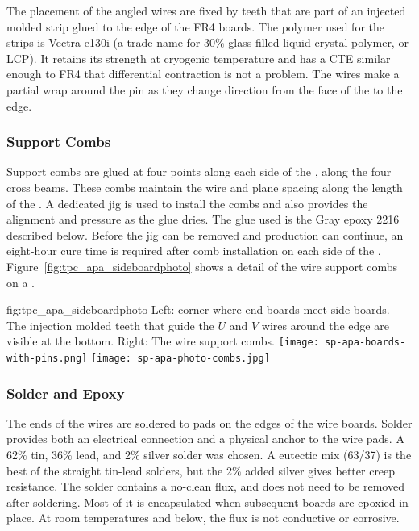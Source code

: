 The placement of the angled wires are fixed by teeth that are part of an injected molded strip glued to the edge of the FR4 boards.  The polymer used for the strips is Vectra e130i (a trade name for 30$\%$ glass filled liquid crystal polymer, or LCP). It retains its strength at cryogenic temperature and has a CTE similar enough to FR4 that differential contraction is not a problem.  The wires make a partial wrap around the pin as they change direction from the face of the  to the edge.

\subsubsection{Support Combs}
\label{sec:combs}

Support combs are glued at four points along each side of the , along the four cross beams. These combs maintain the wire and plane spacing along the length of the . A dedicated jig is used to install the combs and also provides the alignment and pressure as the glue dries. The glue used is the Gray epoxy \num{2216} described below. Before the jig can be removed and production can continue, an eight-hour cure time is required after comb installation on each side of the .  Figure~\ref{fig:tpc_apa_sideboardphoto} shows a detail of the wire support combs on a  .

\begin{dunefigure}{fig:tpc_apa_sideboardphoto}
{Left:  corner where end boards meet side boards.  The injection molded teeth that guide the $U$ and $V$ wires around the edge are visible at the bottom. Right: The wire support combs.}
\texttt{[image: sp-apa-boards-with-pins.png]} \quad
\texttt{[image: sp-apa-photo-combs.jpg]}
\end{dunefigure}

\subsubsection{Solder and Epoxy}
\label{sec:glue-solder}

The ends of the wires are soldered to pads on the edges of the wire boards.  Solder provides both an electrical connection and a physical anchor to the wire pads. A 62$\%$ tin, 36$\%$ lead, and 2$\%$ silver solder was chosen.  A eutectic mix (63/37) is the best of the straight tin-lead solders, but the 2$\%$ added silver gives better creep resistance.  The solder contains a no-clean flux, and does not need to be removed after soldering. Most of it is encapsulated when subsequent boards are epoxied in place.  At room temperatures and below, the flux is not conductive or corrosive.

